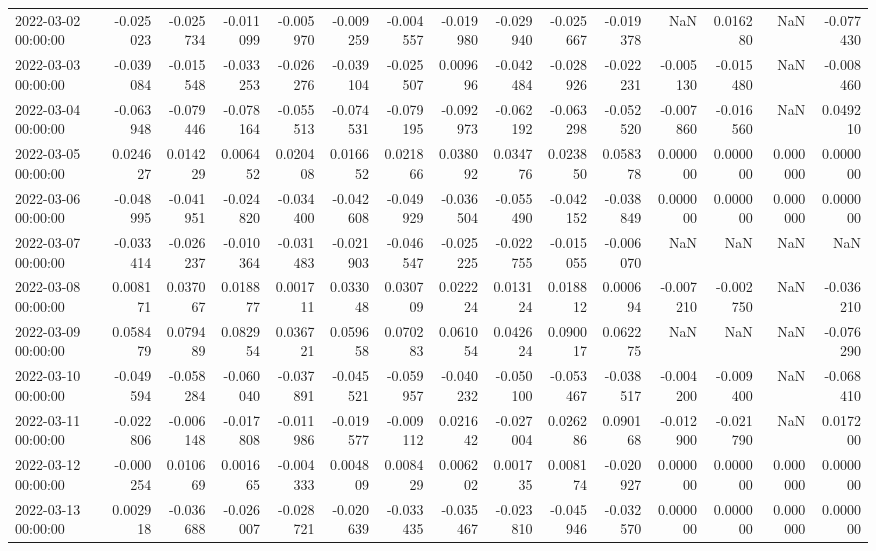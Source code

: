 \begin{tabular}{lrrrrrrrrrrrrrr}
2022-03-02 00:00:00 & -0.025023 & -0.025734 & -0.011099 & -0.005970 & -0.009259 & -0.004557 & -0.019980 & -0.029940 & -0.025667 & -0.019378 & NaN & 0.016280 & NaN & -0.077430 \\
2022-03-03 00:00:00 & -0.039084 & -0.015548 & -0.033253 & -0.026276 & -0.039104 & -0.025507 & 0.009696 & -0.042484 & -0.028926 & -0.022231 & -0.005130 & -0.015480 & NaN & -0.008460 \\
2022-03-04 00:00:00 & -0.063948 & -0.079446 & -0.078164 & -0.055513 & -0.074531 & -0.079195 & -0.092973 & -0.062192 & -0.063298 & -0.052520 & -0.007860 & -0.016560 & NaN & 0.049210 \\
2022-03-05 00:00:00 & 0.024627 & 0.014229 & 0.006452 & 0.020408 & 0.016652 & 0.021866 & 0.038092 & 0.034776 & 0.023850 & 0.058378 & 0.000000 & 0.000000 & 0.000000 & 0.000000 \\
2022-03-06 00:00:00 & -0.048995 & -0.041951 & -0.024820 & -0.034400 & -0.042608 & -0.049929 & -0.036504 & -0.055490 & -0.042152 & -0.038849 & 0.000000 & 0.000000 & 0.000000 & 0.000000 \\
2022-03-07 00:00:00 & -0.033414 & -0.026237 & -0.010364 & -0.031483 & -0.021903 & -0.046547 & -0.025225 & -0.022755 & -0.015055 & -0.006070 & NaN & NaN & NaN & NaN \\
2022-03-08 00:00:00 & 0.008171 & 0.037067 & 0.018877 & 0.001711 & 0.033048 & 0.030709 & 0.022224 & 0.013124 & 0.018812 & 0.000694 & -0.007210 & -0.002750 & NaN & -0.036210 \\
2022-03-09 00:00:00 & 0.058479 & 0.079489 & 0.082954 & 0.036721 & 0.059658 & 0.070283 & 0.061054 & 0.042624 & 0.090017 & 0.062275 & NaN & NaN & NaN & -0.076290 \\
2022-03-10 00:00:00 & -0.049594 & -0.058284 & -0.060040 & -0.037891 & -0.045521 & -0.059957 & -0.040232 & -0.050100 & -0.053467 & -0.038517 & -0.004200 & -0.009400 & NaN & -0.068410 \\
2022-03-11 00:00:00 & -0.022806 & -0.006148 & -0.017808 & -0.011986 & -0.019577 & -0.009112 & 0.021642 & -0.027004 & 0.026286 & 0.090168 & -0.012900 & -0.021790 & NaN & 0.017200 \\
2022-03-12 00:00:00 & -0.000254 & 0.010669 & 0.001665 & -0.004333 & 0.004809 & 0.008429 & 0.006202 & 0.001735 & 0.008174 & -0.020927 & 0.000000 & 0.000000 & 0.000000 & 0.000000 \\
2022-03-13 00:00:00 & 0.002918 & -0.036688 & -0.026007 & -0.028721 & -0.020639 & -0.033435 & -0.035467 & -0.023810 & -0.045946 & -0.032570 & 0.000000 & 0.000000 & 0.000000 & 0.000000 \\

\end{tabular}
